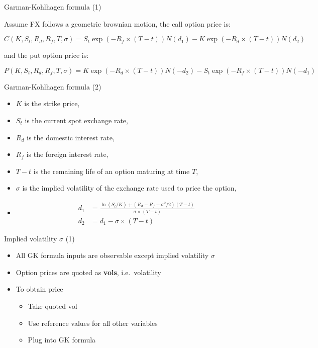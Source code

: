 \begin{frame}{Garman-Kohlhagen formula (1)}

Assume FX follows a geometric brownian motion, the call option price is:

\[
\boxed{
C(K,S_t,R_d,R_f,T,\sigma) = S_t \exp(-R_f\times(T-t))N(d_1) - K\exp(-R_d \times (T-t))N(d_2)
}
\]

and the put option price is:

\[
\boxed{
P(K,S_t,R_d,R_f,T,\sigma) = K\exp(-R_d \times (T-t))N(-d_2) - S_t \exp(-R_f\times(T-t))N(-d_1) 
}
\]

\end{frame}

\begin{frame}{Garman-Kohlhagen formula (2)}

\begin{itemize}
\tightlist
\item
  \(K\) is the strike price,
\item
  \(S_t\) is the current spot exchange rate,
\item
  \(R_d\) is the domestic interest rate,
\item
  \(R_f\) is the foreign interest rate,
\item
  \(T-t\) is the remaining life of an option maturing at time \(T\),
\item
  \(\sigma\) is the implied volatility of the exchange rate used to
  price the option,
\item
  \[
  \begin{aligned}
  d_1 &= \frac{\ln(S_t/K)+(R_d-R_f+\sigma^2/2)(T-t)}{\sigma \times (T-t)}\\
  d_2 &= d_1 - \sigma \times (T-t)
  \end{aligned}
  \]
\end{itemize}

\end{frame}

\begin{frame}{Implied volatility \(\sigma\) (1)}

\begin{itemize}
\tightlist
\item
  All GK formula inputs are observable except implied volatility
  \(\sigma\)\\[2\baselineskip]
\item
  Option prices are quoted as \textbf{vols},
  i.e.~volatility\\[2\baselineskip]
\item
  To obtain price

  \begin{itemize}
  \tightlist
  \item
    Take quoted vol
  \item
    Use reference values for all other variables
  \item
    Plug into GK formula
  \end{itemize}
\end{itemize}

\end{frame}

